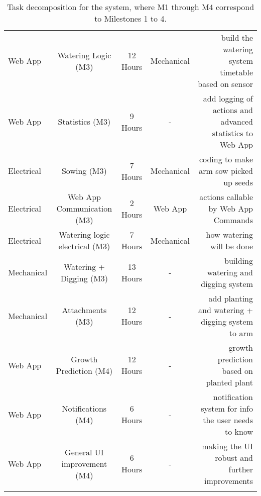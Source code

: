 \begin{table*}[h]
\begin{center}
\begin{small}
\begin{sc}
\begin{tabular}{lcccr}
Web App & Watering Logic (M3) & 12 Hours & Mechanical & build the watering system timetable based on sensor \\
Web App & Statistics (M3) & 9 Hours & - & add logging of actions and \newline advanced statistics to Web App \\

Electrical & Sowing (M3) & 7 Hours & Mechanical & coding to make arm sow picked up seeds \\
Electrical & Web App Communication (M3) & 2 Hours & Web App & actions callable by Web App Commands \\
Electrical & Watering logic electrical (M3) & 7 Hours & Mechanical & how watering will be done \\
Mechanical & Watering + Digging (M3) & 13 Hours & - & building watering and digging system \\
Mechanical & Attachments (M3) & 12 Hours & - & add planting and watering + digging system to arm \\

Web App & Growth Prediction (M4) & 12 Hours & - & growth prediction based on planted plant \\
Web App & Notifications (M4) & 6 Hours & - & notification system for info the user needs to know \\ 
Web App & General UI improvement (M4) & 6 Hours & - & making the UI robust and further improvements \\




\belowspace
\end{tabular}
\end{sc}
\end{small}
\caption{Task decomposition for the system, where M1 through M4 correspond to Milestones 1 to 4.}
\label{tab:atomic_tasks}
\end{center}
\vskip -3mm
\end{table*}
